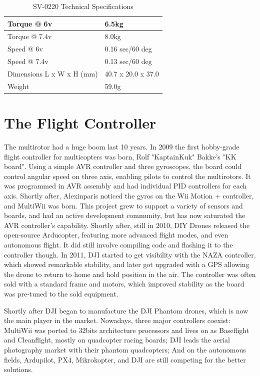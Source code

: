 \begin{table}[h]
\centering
\caption{SV-0220 Technical Specifications}
\label{my-label}
\begin{tabular}{|l|l|}
\hline
 Torque @ 6v &   6.5kg  \\ \hline
 Torque @ 7.4v & 8.0kg  \\ \hline
 Speed @ 6v    &  0.16 sec/60 deg  \\ \hline
 Speed @ 7.4v  &  0.13 sec/60 deg  \\ \hline
 Dimensions L x W x H (mm) &  40.7 x 20.0 x 37.0   \\ \hline
 Weight & 59.0g   \\ \hline
\end{tabular}
\end{table}

\section{The Flight Controller}

The multirotor had a huge boom last 10 years. In 2009 the first hobby-grade flight controller for multicopters was born, Rolf "KaptainKuk" Bakke's "KK board". Using a simple AVR controller and three gyroscopes, the board could control angular speed on three axis, enabling pilots to control the multirotors. It was programmed in AVR assembly and had individual PID controllers for each axis.
%
Shortly after, Alexinparis noticed the gyros on the Wii Motion + controller, and MultiWii was born. This project grew to support a variety of sensors and boards, and had an active development community, but has now saturated the AVR controller's capability.
%
Shortly after, still in 2010, DIY Drones released the open-source Arducopter, featuring more advanced flight modes, and even autonomous flight.  It did still involve compiling code and flashing it to the controller though.
%
In 2011, DJI started to get visibility with the NAZA controller, which showed remarkable stability, and later got upgraded with a GPS allowing the drone to return to home and hold position in the air. The controller was often sold with a standard frame and motors, which improved stability as the board was pre-tuned to the sold equipment.

Shortly after DJI began to manufacture the DJI Phantom drones, which is now the main player in the market.
%
Nowadays, three major controllers coexist: MultiWii was ported to 32bits architecture processors and lives on as Baseflight and Cleanflight, mostly on quadcopter racing boards; DJI leads the aerial photography market with their phantom quadcopters; And on the autonomous fields, Ardupilot, PX4, Mikrokopter, and DJI are still competing for the better solutions.



